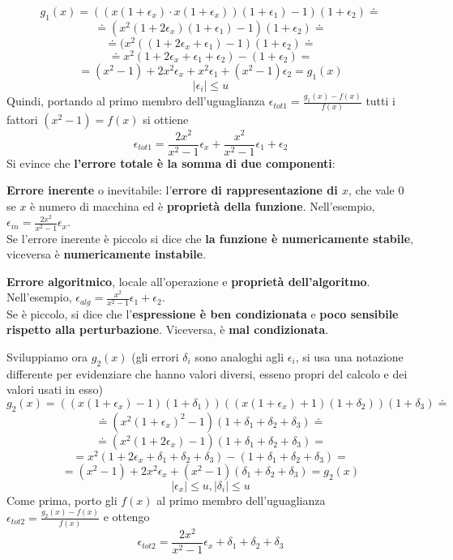 \documentclass[10pt]{book}
\begin{document}
$$g_1(x) = ((x(1+\epsilon_x)\cdot x(1 + \epsilon_x))(1 + \epsilon_1) - 1)(1 + \epsilon_2) \doteq$$
$$\doteq (x^2(1 + 2\epsilon_x)(1 + \epsilon_1) - 1)(1 + \epsilon_2) \doteq$$
$$\doteq (x^2 ((1 + 2\epsilon_x + \epsilon_1) - 1)(1 + \epsilon_2) \doteq$$
$$\doteq x^2(1 + 2\epsilon_x + \epsilon_1 + \epsilon_2) - (1 + \epsilon_2) =$$
$$= (x^2 - 1) + 2x^2\epsilon_x + x^2\epsilon_1 + (x^2 - 1)\epsilon_2 = g_1(x)$$
$$|\epsilon_i| \leq u$$ Quindi, portando al primo membro dell'uguaglianza $\epsilon_{tot1} = \frac{g_1(x) - f(x)}{f(x)}$ tutti i fattori $(x^2 - 1) = f(x)$ si ottiene $$\epsilon_{tot1} = \frac{2x^2}{x^2 - 1}\epsilon_x + \frac{x^2}{x^2 - 1}\epsilon_1 + \epsilon_2$$ Si evince che \textbf{l'errore totale è la somma di due componenti}:
\begin{list}{}{}
	\item \textbf{Errore inerente} o inevitabile: l'\textbf{errore di rappresentazione di $x$}, che vale 0 se $x$ è numero di macchina ed è \textbf{proprietà della funzione}. Nell'esempio, $\epsilon_{in} = \frac{2x^2}{x^2 - 1}\epsilon_x$.\\
	Se l'errore inerente è piccolo si dice che \textbf{la funzione è numericamente stabile}, viceversa è \textbf{numericamente instabile}.
	\item \textbf{Errore algoritmico}, locale all'operazione e \textbf{proprietà dell'algoritmo}. Nell'esempio, $\epsilon_{alg} = \frac{x^2}{x^2 - 1}\epsilon_1 + \epsilon_2$.\\
	Se è piccolo, si dice che l'\textbf{espressione è ben condizionata} e \textbf{poco sensibile rispetto alla perturbazione}. Viceversa, è \textbf{mal condizionata}.
\end{list}
Sviluppiamo ora $g_2(x)$ (gli errori $\delta_i$ sono analoghi agli $\epsilon_i$, si usa una notazione differente per evidenziare che hanno valori diversi, esseno propri del calcolo e dei valori usati in esso)
$$g_2(x) = ((x(1 + \epsilon_x) - 1)(1 + \delta_1))((x(1 + \epsilon_x) + 1)(1 + \delta_2))(1 + \delta_3) \doteq$$
$$\doteq (x^2(1 + \epsilon_x)^2 - 1)(1 + \delta_1 + \delta_2 + \delta_3) \doteq$$
$$\doteq (x^2(1 + 2\epsilon_x) - 1)(1 + \delta_1 + \delta_2 + \delta_3) =$$
$$= x^2(1 + 2\epsilon_x + \delta_1 + \delta_2 + \delta_3) - (1 + \delta_1 + \delta_2 + \delta_3) =$$
$$= (x^2 - 1) + 2x^2\epsilon_x + (x^2 - 1)(\delta_1 + \delta_2 + \delta_3) = g_2(x)$$
$$|\epsilon_x| \leq u, |\delta_i| \leq u$$
Come prima, porto gli $f(x)$ al primo membro dell'uguaglianza $\epsilon_{tot2} = \frac{g_2(x) - f(x)}{f(x)}$ e ottengo
$$\epsilon_{tot2} = \frac{2x^2}{x^2 - 1}\epsilon_x + \delta_1 + \delta_2 + \delta_3$$
\pagebreak
\end{document}
